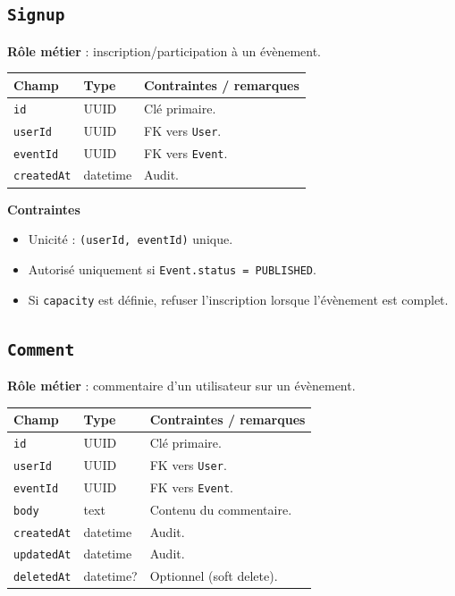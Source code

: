 \documentclass[11pt,a4paper]{article}
\begin{document}
\subsection{\texttt{Signup}}
\textbf{Rôle métier} : inscription/participation à un évènement.

\begin{longtable}{@{}p{}p{}p{}@{}}
\toprule
\textbf{Champ} & \textbf{Type} & \textbf{Contraintes / remarques}\\
\midrule
\endhead
\texttt{id} & UUID & Clé primaire.\\
\texttt{userId} & UUID & FK vers \texttt{User}.\\
\texttt{eventId} & UUID & FK vers \texttt{Event}.\\
\texttt{createdAt} & datetime & Audit.\\
\bottomrule
\end{longtable}

\textbf{Contraintes}
\begin{itemize}
  \item Unicité : \texttt{(userId, eventId)} unique.
  \item Autorisé uniquement si \texttt{Event.status = PUBLISHED}.
  \item Si \texttt{capacity} est définie, refuser l’inscription lorsque l’évènement est complet.
\end{itemize}

\subsection{\texttt{Comment}}
\textbf{Rôle métier} : commentaire d’un utilisateur sur un évènement.

\begin{longtable}{@{}p{}p{}p{}@{}}
\toprule
\textbf{Champ} & \textbf{Type} & \textbf{Contraintes / remarques}\\
\midrule
\endhead
\texttt{id} & UUID & Clé primaire.\\
\texttt{userId} & UUID & FK vers \texttt{User}.\\
\texttt{eventId} & UUID & FK vers \texttt{Event}.\\
\texttt{body} & text & Contenu du commentaire.\\
\texttt{createdAt} & datetime & Audit.\\
\texttt{updatedAt} & datetime & Audit.\\
\texttt{deletedAt} & datetime? & Optionnel (soft delete).\\
\bottomrule
\end{longtable}
\end{document}

